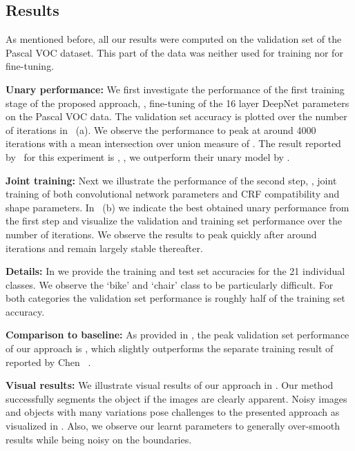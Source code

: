 \subsection{Results}
As mentioned before, all our results were computed on the validation set of the Pascal VOC dataset. This part of the data was neither used for training nor for fine-tuning. 

{\bfseries Unary performance:} We first investigate the performance of the first training stage of the proposed approach, \ie, fine-tuning of the 16 layer DeepNet parameters on the Pascal VOC data. The validation set accuracy is plotted over the number of iterations in ~(a). We observe the performance to peak at around 4000 iterations with a mean intersection over union measure of . The result reported by~\cite{ChenARXIV2015b} for this experiment is , \ie, we outperform their unary model by . 



{\bfseries Joint training:} Next we illustrate the performance of the second step, \ie, joint training of both convolutional network parameters and CRF compatibility and shape parameters. In ~(b) we indicate the best obtained unary performance from the first step and visualize the validation and training set performance over the number of iterations. We observe the results to peak quickly after around  iterations and remain largely stable thereafter. 





{\bfseries Details: } In  we provide the training and test set accuracies for the 21 individual classes. We observe the `bike' and `chair' class to be particularly difficult. For both categories the validation set performance is roughly half of the training set accuracy.

{\bfseries Comparison to baseline: } As provided in , the peak validation set performance of our approach is , which slightly outperforms the separate training result of  reported by Chen \etal~\cite{ChenARXIV2015b}.





{\bfseries Visual results: } We illustrate visual results of our approach in . Our method successfully segments the object if the images are clearly apparent. Noisy images and objects with many variations pose challenges to the presented approach as visualized in . Also, we observe our learnt parameters to generally over-smooth results while being noisy on the boundaries. 















